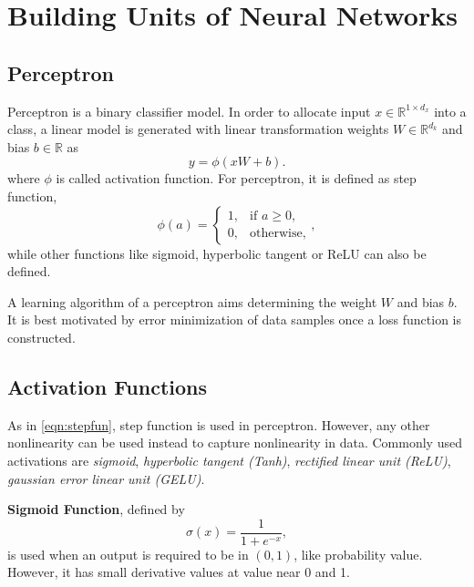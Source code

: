 \section{Building Units of Neural Networks}
\label{sec:building_units}

\subsection{Perceptron}

Perceptron is a binary classifier model. 
In order to allocate input $x \in \mathbb{R}^{1 \times d_x}$ into a class, a linear model is generated with linear transformation weights $W \in \mathbb{R}^{d_k}$ and bias $b \in \mathbb{R}$ as 
\begin{equation}
\label{eqn:perceptron1}
y = \phi(x W + b).
\end{equation}
where $\phi$ is called activation function. 
For perceptron, it is defined as step function, 
\begin{equation}
\label{eqn:stepfun}
\phi(a) = 
\begin{cases}
1,   & \text{if } a\geq 0,\\
0,   & \text{otherwise},
\end{cases},
\end{equation}
while other functions like sigmoid, hyperbolic tangent or ReLU can also be defined. 

A learning algorithm of a perceptron aims determining the weight $W$ and bias $b$. 
It is best motivated by error minimization of data samples once a loss function is constructed. 

\subsection{Activation Functions}

As in \eqref{eqn:stepfun}, step function is used in perceptron. 
However, any other nonlinearity can be used instead to capture nonlinearity in data. 
Commonly used activations are \textit{sigmoid}, \textit{hyperbolic tangent (Tanh)}, \textit{rectified linear unit (ReLU)}, \textit{gaussian error linear unit (GELU)}. 

\textbf{Sigmoid Function}, defined by 
\begin{equation}
\label{eqn:sigmoid_fcn}
\sigma(x) = \frac{1}{1+e^{-x}},
\end{equation}
is used when an output is required to be in $(0,1)$, like probability value. However, it has small derivative values at value near 0 and 1. 

